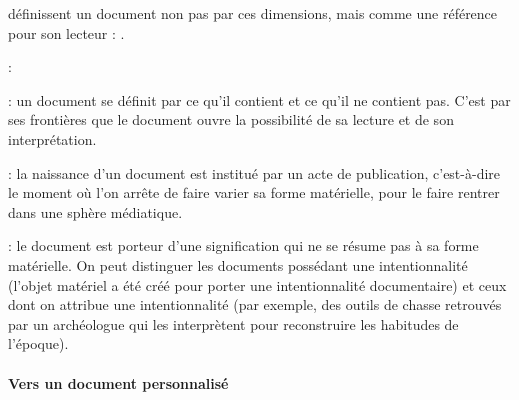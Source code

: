 \cite{Morizet-mahoudeaux2005a} définissent un document non pas par ces dimensions, mais comme une référence pour son lecteur : .


\begin{liste}
	\item {} :  

	\item {} : un document se définit par ce qu'il contient et ce qu'il ne contient pas.
	C'est par ses frontières que le document ouvre la possibilité de sa lecture et de son interprétation.

	\item {} : la naissance d'un document est institué par un acte de publication, c'est-à-dire le moment où l'on arrête de faire varier sa forme matérielle, pour le faire rentrer dans une sphère médiatique.

	\item {} : le document est porteur d'une signification qui ne se résume pas à sa forme matérielle.
	On peut distinguer les documents possédant une intentionnalité  (l'objet matériel a été créé pour porter une intentionnalité documentaire) et ceux dont on attribue une intentionnalité  (par exemple, des outils de chasse retrouvés par un archéologue qui les interprètent pour reconstruire les habitudes de l'époque).
\end{liste}









\paragraph{Vers un document personnalisé}

